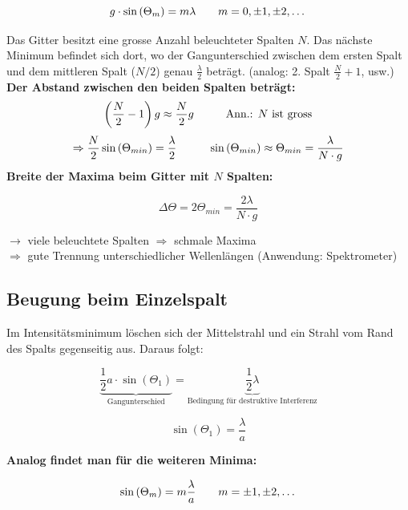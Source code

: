 \[
    g \cdot \sin{(\Theta_m)} = m\lambda \hspace{7mm} m = 0,  \pm 1, \pm 2, \dots
\]

Das Gitter besitzt eine grosse Anzahl beleuchteter Spalten $N$. Das nächste Minimum befindet sich dort, wo der Gangunterschied zwischen dem ersten Spalt und dem mittleren Spalt ($N/2$) genau $\frac{\lambda}{2}$ beträgt. (analog: 2. Spalt $\frac{N}{2} + 1$, usw.) \\[1ex]

\textbf{Der Abstand zwischen den beiden Spalten beträgt:}
\[
    \left( \frac{N}{2} - 1 \right) g \approx \frac{N}{2}g \hspace{10mm} \text{Ann.: $N$ ist gross} 
\]
\[
    \Rightarrow \frac{N}{2}\sin{(\Theta_{min})} = \frac{\lambda}{2} \hspace{10mm} \sin{(\Theta_{min}) \approx \Theta_{min} = \frac{\lambda}{N \cdot g}}
\]
\textbf{Breite der Maxima beim Gitter mit $N$ Spalten:}

\begin{formulabox}
    \[
        \Delta \Theta = 2 \Theta_{min} = \frac{2 \lambda}{N \cdot g}
    \]
\end{formulabox}
 
\hspace{5mm} $\rightarrow$ viele beleuchtete Spalten $\Rightarrow$ schmale Maxima \\
\hspace{5mm} $\Rightarrow$ gute Trennung unterschiedlicher Wellenlängen \hspace{1mm} (Anwendung: Spektrometer)

\subsection{Beugung beim Einzelspalt}
Im Intensitätsminimum löschen sich der Mittelstrahl und ein Strahl vom Rand des Spalts gegenseitig aus. Daraus folgt: 

\[
    \underbrace{\frac{1}{2}a  \cdot \sin{(\Theta_1)}}_{\text{Gangunterschied}} = \underbrace{\frac{1}{2}\lambda}_{\text{Bedingung für destruktive Interferenz}}
\]

\begin{formulabox}
    \[
        \sin{(\Theta_1)} = \frac{\lambda}{a}
    \]
\end{formulabox}

\textbf{Analog findet man für die weiteren Minima:}

\begin{formulabox}
    \[
        \sin{(\Theta_m)} = m \frac{\lambda}{a} \hspace{7mm} m = \pm 1, \pm 2, \dots
    \]
\end{formulabox}

